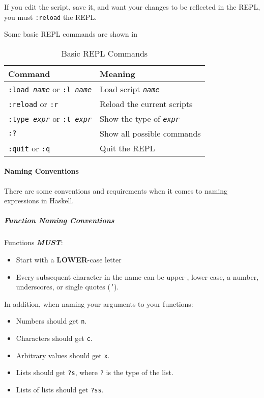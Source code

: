 If you edit the script, save it, and want your changes to be reflected in the REPL, you must \texttt{:reload} the REPL.\@

Some basic REPL commands are shown in 

\begin{table}[h!tbp]
  \centering
  \begin{tabular}{ll}
    \toprule
    Command & Meaning \\
    \midrule
    \texttt{:load \emph{name}} or \texttt{:l \emph{name}} & Load script \texttt{\emph{name}} \\
    \texttt{:reload} or \texttt{:r} & Reload the current scripts \\
    \texttt{:type \emph{expr}} or \texttt{:t \emph{expr}} & Show the type of \texttt{\emph{expr}} \\
    \texttt{:?} & Show all possible commands\\
    \texttt{:quit} or \texttt{:q} & Quit the REPL \\
    \bottomrule
  \end{tabular}
  \caption{Basic REPL Commands}
  \label{tab:Basic_REPL_Commands}
\end{table}

\paragraph{Naming Conventions}\label{par:Naming_Conventions}
There are some conventions and requirements when it comes to naming expressions in Haskell.

\subparagraph{Function Naming Conventions}\label{subpar:Function_Naming_Conventions}
Functions \textbf{\emph{MUST}}:
\begin{itemize}[noitemsep]
\item Start with a \textbf{LOWER}-case letter
\item Every subsequent character in the name can be upper-, lower-case, a number, underscores, or single quotes (\texttt{'}).
\end{itemize}

In addition, when naming your arguments to your functions:
\begin{itemize}[noitemsep]
\item Numbers should get \texttt{n}.
\item Characters should get \texttt{c}.
\item Arbitrary values should get \texttt{x}.
\item Lists should get \texttt{?s}, where \texttt{?} is the type of the list.
\item Lists of lists should get \texttt{?ss}.
\end{itemize}

